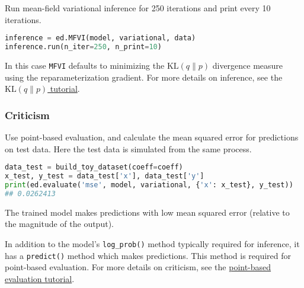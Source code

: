 Run mean-field variational inference for 250 iterations and print
every 10 iterations.
\begin{lstlisting}[language=Python]
inference = ed.MFVI(model, variational, data)
inference.run(n_iter=250, n_print=10)
\end{lstlisting}
In this case \texttt{MFVI} defaults to minimizing the
$\text{KL}(q\|p)$ divergence measure using the reparameterization
gradient.
For more details on inference, see the \href{tut_KLqp.html}{$\text{KL}(q\|p)$ tutorial}.


\subsubsection{Criticism}

Use point-based evaluation, and calculate the mean squared
error for predictions on test data. Here the test data is simulated
from the same process.

\begin{lstlisting}[language=Python]
data_test = build_toy_dataset(coeff=coeff)
x_test, y_test = data_test['x'], data_test['y']
print(ed.evaluate('mse', model, variational, {'x': x_test}, y_test))
## 0.0262413
\end{lstlisting}

The trained model makes predictions with low mean squared error
(relative to the magnitude of the output).

In addition to the model's \texttt{log_prob()} method typically required for
inference, it has a \texttt{predict()} method which makes
predictions. This method is required for point-based evaluation. For
more details on criticism, see the \href{tut_point_eval.html}{point-based
evaluation tutorial}.
